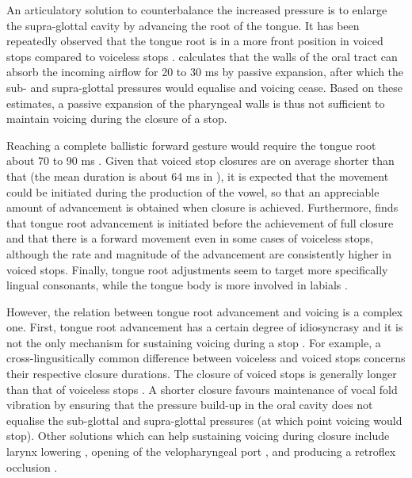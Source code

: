 \documentclass[12pt,]{article}
\begin{document}
An articulatory solution to counterbalance the increased pressure is to
enlarge the supra-glottal cavity by advancing the root of the tongue. It
has been repeatedly observed that the tongue root is in a more front
position in voiced stops compared to voiceless stops
\citep{kent1969, perkell1969, westbury1983}. \citet{rothenberg1967}
calculates that the walls of the oral tract can absorb the incoming
airflow for 20 to 30 ms by passive expansion, after which the sub- and
supra-glottal pressures would equalise and voicing cease. Based on these
estimates, a passive expansion of the pharyngeal walls is thus not
sufficient to maintain voicing during the closure of a stop.

Reaching a complete ballistic forward gesture would require the tongue
root about 70 to 90 ms \citep{rothenberg1967}. Given that voiced stop
closures are on average shorter than that (the mean duration is about 64
ms in \citealt{luce1985}), it is expected that the movement could be
initiated during the production of the vowel, so that an appreciable
amount of advancement is obtained when closure is achieved. Furthermore,
\citet{westbury1983} finds that tongue root advancement is initiated
before the achievement of full closure and that there is a forward
movement even in some cases of voiceless stops, although the rate and
magnitude of the advancement are consistently higher in voiced stops.
Finally, tongue root adjustments seem to target more specifically
lingual consonants, while the tongue body is more involved in labials
\citep{perkell1969, westbury1983}.

However, the relation between tongue root advancement and voicing is a
complex one. First, tongue root advancement has a certain degree of
idiosyncrasy \citep{ahn2018} and it is not the only mechanism for
sustaining voicing during a stop
\citep{rothenberg1967, westbury1983, ohala2011}. For example, a
cross-lingusitically common difference between voiceless and voiced
stops concerns their respective closure durations. The closure of voiced
stops is generally longer than that of voiceless stops
\citep{lisker1957, umeda1977, van-summers1987, davis1989, de-jong1991}.
A shorter closure favours maintenance of vocal fold vibration by
ensuring that the pressure build-up in the oral cavity does not equalise
the sub-glottal and supra-glottal pressures (at which point voicing
would stop). Other solutions which can help sustaining voicing during
closure include larynx lowering \citep{riordan1980}, opening of the
velopharyngeal port \citep{yanagihara1966}, and producing a retroflex
occlusion \citep{sprouse2008}.
\end{document}
